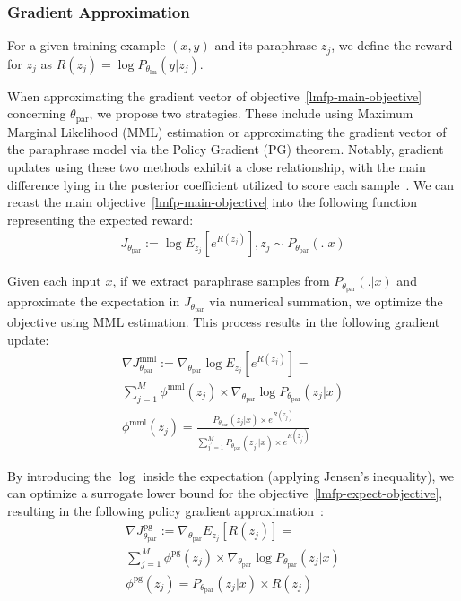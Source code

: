 \documentclass[11pt]{article}
\begin{document}
\subsubsection{Gradient Approximation}
For a given training example $(x, y)$ and its paraphrase $z_{j}$, we define the reward for $z_{j}$ as $R(z_{j}) = \log P_{\theta_{\text{lm}}} (y | z_{j})$.

When approximating the gradient vector of objective~\ref{lmfp-main-objective} concerning $\theta_{\text{par}}$, we propose two strategies. These include using Maximum Marginal Likelihood (MML) estimation or approximating the gradient vector of the paraphrase model via the Policy Gradient (PG) theorem. Notably, gradient updates using these two methods exhibit a close relationship, with the main difference lying in the posterior coefficient utilized to score each sample~\cite{guu-etal-2017-language}. We can recast the main objective~\ref{lmfp-main-objective} into the following function representing the expected reward:
\begin{multline}
J_{\theta_{\text{par}}}
:= \log E_{z_{j}} [e^{R(z_{j})}],
z_{j} \sim P_{\theta_{\text{par}}}(.|x)
\label{lmfp-expect-objective}
\end{multline}

Given each input $x$, if we extract paraphrase samples from $P_{\theta_{\text{par}}}(.|x)$ and approximate the expectation in $J_{\theta_{\text{par}}}$ via numerical summation, we optimize the objective using MML estimation. This process results in the following gradient update:
\begin{multline}
\nabla J^{\text{mml}}_{\theta_{\text{par}}} := \nabla_{\theta_{\text{par}}} \log E_{z_{j}} [e^{R(z_{j})}] = \\
\sum^{M}_{j=1} \phi^{\text{mml}}(z_{j}) \times \nabla_{\theta_{\text{par}}} \log P_{\theta_{\text{par}}}(z_{j}|x) \\
\phi^{\text{mml}}(z_{j}) = \frac{P_{\theta_{\text{par}}}(z_{j}|x) \times e^{R(z_{j})}}{\sum^{M}_{j^{'}=1} P_{\theta_{\text{par}}}(z_{j^{'}}|x) \times e^{R(z_{j^{'}})}}
\label{mml-objective}
\end{multline}

By introducing the $\log$ inside the expectation (applying Jensen's inequality), we can optimize a surrogate lower bound for the objective~\ref{lmfp-expect-objective}, resulting in the following policy gradient approximation~\cite{10.5555/3009657.3009806}:
\begin{multline}
\nabla J^{\text{pg}}_{\theta_{\text{par}}} := \nabla_{\theta_{\text{par}}} E_{z_{j}} [R(z_{j})] = \\
\sum^{M}_{j=1} \phi^{\text{pg}}(z_{j}) \times \nabla_{\theta_{\text{par}}} \log P_{\theta_{\text{par}}}(z_{j}|x) \\
\phi^{\text{pg}}(z_{j}) = P_{\theta_{\text{par}}}(z_{j}|x) \times R(z_{j})
\label{pg-objective}
\end{multline}
\end{document}
